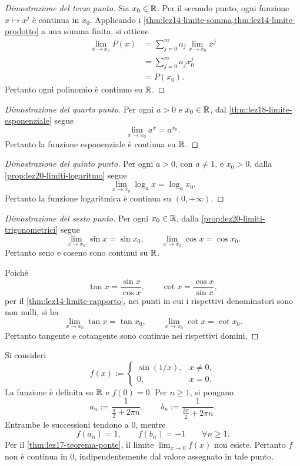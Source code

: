 \begin{proof}[Dimostrazione del terzo punto]
Sia \(x_0\in\mathbb{R}\). Per il secondo punto,
ogni funzione \(x\mapsto x^j\) è continua
in \(x_0\). Applicando i
\cref{thm:lez14-limite-somma,thm:lez14-limite-prodotto}
a una somma finita, si ottiene
\[
\begin{aligned}
  \lim_{x\to x_0}P(x)
  &=\sum_{j=0}^{m}a_j\lim_{x\to x_0}x^j\\
  &=\sum_{j=0}^{m}a_jx_0^j\\
  &=P(x_0).
\end{aligned}
\]
Pertanto ogni polinomio è continuo su \(\mathbb{R}\).
\end{proof}

\begin{proof}[Dimostrazione del quarto punto]
Per ogni \(a>0\) e \(x_0\in\mathbb{R}\), dal
\cref{thm:lez18-limite-esponenziale} segue
\[
  \lim_{x\to x_0}a^x=a^{x_0}.
\]
Pertanto la funzione esponenziale è continua
su \(\mathbb{R}\).
\end{proof}

\begin{proof}[Dimostrazione del quinto punto]
Per ogni \(a>0\), con \(a\ne1\), e \(x_0>0\),
dalla \cref{prop:lez20-limiti-logaritmo} segue
\[
  \lim_{x\to x_0}\log_a x=\log_a x_0.
\]
Pertanto la funzione logaritmica è continua
su \((0,+\infty)\).
\end{proof}

\begin{proof}[Dimostrazione del sesto punto]
Per ogni \(x_0\in\mathbb{R}\), dalla
\cref{prop:lez20-limiti-trigonometrici} segue
\[
  \lim_{x\to x_0}\sin x=\sin x_0,
  \qquad
  \lim_{x\to x_0}\cos x=\cos x_0.
\]
Pertanto seno e coseno sono continui su \(\mathbb{R}\).

Poiché
\[
  \tan x=\frac{\sin x}{\cos x},
  \qquad
  \cot x=\frac{\cos x}{\sin x},
\]
per il \cref{thm:lez14-limite-rapporto},
nei punti in cui i rispettivi denominatori
sono non nulli, si ha
\[
  \lim_{x\to x_0}\tan x=\tan x_0,
  \qquad
  \lim_{x\to x_0}\cot x=\cot x_0.
\]
Pertanto tangente e cotangente sono continue
nei rispettivi domini.
\end{proof}

\begin{example}
\label{ex:lez21-seno-reciproco}
Si consideri
\[
  f(x):=
  \begin{cases}
    \sin(1/x), & x\ne0,\\
    0, & x=0.
  \end{cases}
\]
La funzione è definita su \(\mathbb{R}\) e \(f(0)=0\).
Per \(n\ge1\), si pongano
\[
  a_n:=\frac1{\frac\pi2+2\pi n},
  \qquad
  b_n:=\frac1{\frac{3\pi}2+2\pi n}.
\]
Entrambe le successioni tendono a \(0\), mentre
\[
  f(a_n)=1,\qquad f(b_n)=-1
  \qquad\forall n\ge1.
\]
Per il \cref{thm:lez17-teorema-ponte}, il limite
\(\lim_{x\to0}f(x)\) non esiste. Pertanto \(f\)
non è continua in \(0\), indipendentemente dal
valore assegnato in tale punto.
\end{example}

